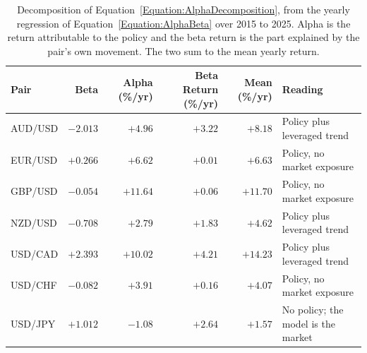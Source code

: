 \begin{table}[htb!]
\centering
\footnotesize
\begin{tabular}{@{}lrrrrl@{}}
\toprule
\textbf{Pair} & \textbf{Beta} & \textbf{Alpha (\%/yr)} & \textbf{Beta Return (\%/yr)} & \textbf{Mean (\%/yr)} & \textbf{Reading} \\
\midrule
AUD/USD & $-2.013$ & $+4.96$ & $+3.22$ & $+8.18$ & Policy plus leveraged trend \\
EUR/USD & $+0.266$ & $+6.62$ & $+0.01$ & $+6.63$ & Policy, no market exposure \\
GBP/USD & $-0.054$ & $+11.64$ & $+0.06$ & $+11.70$ & Policy, no market exposure \\
NZD/USD & $-0.708$ & $+2.79$ & $+1.83$ & $+4.62$ & Policy plus leveraged trend \\
USD/CAD & $+2.393$ & $+10.02$ & $+4.21$ & $+14.23$ & Policy plus leveraged trend \\
USD/CHF & $-0.082$ & $+3.91$ & $+0.16$ & $+4.07$ & Policy, no market exposure \\
USD/JPY & $+1.012$ & $-1.08$ & $+2.64$ & $+1.57$ & No policy; the model is the market \\
\bottomrule
\end{tabular}
\caption{Decomposition of Equation~\ref{Equation:AlphaDecomposition}, from the yearly regression of Equation~\ref{Equation:AlphaBeta} over 2015 to 2025. Alpha is the return attributable to the policy and the beta return is the part explained by the pair's own movement. The two sum to the mean yearly return.}
\label{Tables:AlphaBeta}
\end{table}